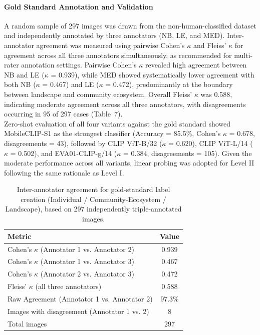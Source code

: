 \documentclass[hidelinks, 11pt]{article}
\begin{document}
\paragraph{Gold Standard Annotation and Validation}
A random sample of 297 images was drawn from the non-human-classified dataset and independently annotated by three annotators (NB, LE, and MED). Inter-annotator agreement was measured using pairwise Cohen's $\kappa$ and Fleiss' $\kappa$ \citep{fleiss_measuring_1971} for agreement across all three annotators simultaneously, as recommended for multi-rater annotation settings. Pairwise Cohen's $\kappa$ revealed high agreement between NB and LE ($\kappa$ = 0.939), while MED showed systematically lower agreement with both NB ($\kappa$ = 0.467) and LE ($\kappa$ = 0.472), predominantly at the boundary between landscape and community ecosystem. Overall Fleiss' $\kappa$ was 0.588, indicating moderate agreement across all three annotators, with disagreements occurring in 95 of 297 cases (Table~7).
\\
Zero-shot evaluation of all four variants against the gold standard showed MobileCLIP-S1 as the strongest classifier (Accuracy = 85.5\%, Cohen's $\kappa$ = 0.678, disagreements = 43), followed by CLIP ViT-B/32 ($\kappa$ = 0.620), CLIP ViT-L/14 ($\kappa$ = 0.502), and EVA01-CLIP-g/14 ($\kappa$ = 0.384, disagreements = 105). Given the moderate performance across all variants, linear probing was adopted for Level II following the same rationale as Level I.

\begin{table}[htbp]
\centering
\caption{Inter-annotator agreement for gold-standard label creation (Individual / Community-Ecosystem / Landscape), based on 297 independently triple-annotated images.}
\label{tab:interannotator_indcoecoland}
\begin{tabular}{@{}lc@{}}
\toprule
\textbf{Metric} & \textbf{Value} \\
\midrule
Cohen's $\kappa$ (Annotator 1 vs. Annotator 2) & 0.939 \\
Cohen's $\kappa$ (Annotator 1 vs. Annotator 3) & 0.467 \\
Cohen's $\kappa$ (Annotator 2 vs. Annotator 3) & 0.472 \\
Fleiss' $\kappa$ (all three annotators)          & 0.588 \\
Raw Agreement (Annotator 1 vs. Annotator 2)     & 97.3\% \\
Images with disagreement (Annotator 1 vs. 2)    & 8 \\
Total images                                     & 297 \\
\bottomrule
\end{tabular}
\end{table}
\end{document}
